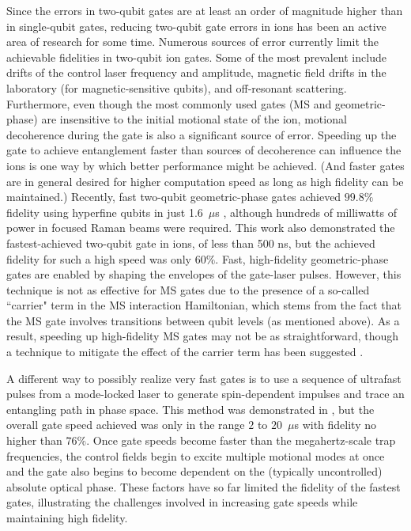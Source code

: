 \documentclass[%
reprint,
 amsmath,amssymb,
]{revtex4-1}
\begin{document}
Since the errors in two-qubit gates are at least an order of magnitude higher than in single-qubit gates, reducing two-qubit gate errors in ions has been an active area of research for some time. Numerous sources of error currently limit the achievable fidelities in two-qubit ion gates. Some of the most prevalent include drifts of the control laser frequency and amplitude, magnetic field drifts in the laboratory (for magnetic-sensitive qubits), and off-resonant scattering. Furthermore, even though the most commonly used gates (MS and geometric-phase) are insensitive to the initial motional state of the ion, motional decoherence during the gate is also a significant source of error. Speeding up the gate to achieve entanglement faster than sources of decoherence can influence the ions is one way by which better performance might be achieved. (And faster gates are in general desired for higher computation speed as long as high fidelity can be maintained.)  Recently, fast two-qubit geometric-phase gates \cite{SteanePulseGates2014} achieved $99.8 \%$ fidelity using hyperfine qubits in just 1.6~$\mu$s \cite{SchaferFastIonGates2018}, although hundreds of milliwatts of power in focused Raman beams were required. This work also demonstrated the fastest-achieved two-qubit gate in ions, of less than 500 ns, but the achieved fidelity for such a high speed was only $60 \%$.  Fast, high-fidelity geometric-phase gates are enabled by shaping the envelopes of the gate-laser pulses.  However, this technique is not as effective for MS gates due to the presence of a so-called ``carrier" term in the MS interaction Hamiltonian, which stems from the fact that the MS gate involves transitions between qubit levels (as mentioned above).  As a result, speeding up high-fidelity MS gates may not be as straightforward, though a technique to mitigate the effect of the carrier term has been suggested \cite{MehtaSPIE2019}.

A different way to possibly realize very fast gates is to use a sequence of ultrafast pulses from a mode-locked laser to generate spin-dependent impulses and trace an entangling path in phase space. This method was demonstrated in \cite{WongCamposUltrafast2017}, but the overall gate speed achieved was only in the range $2$ to $20$~$\mu$s with fidelity no higher than $76 \%$. Once gate speeds become faster than the megahertz-scale trap frequencies, the control fields begin to excite multiple motional modes at once and the gate also begins to become dependent on the (typically uncontrolled) absolute optical phase. These factors have so far limited the fidelity of the fastest gates, illustrating the challenges involved in increasing gate speeds while maintaining high fidelity.
\end{document}
